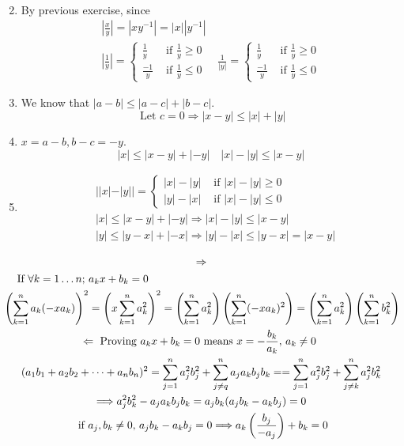 \documentclass[twoside]{amsart}
\theoremstyle{plain}
\theoremstyle{definition}
\newcommand{\exercisehead}[1]
  {\smallskip
   \noindent{\small\bf Exercise #1.}}
\begin{document}
\begin{enumerate}
\[\begin{aligned}
\end{aligned}
\]  
\item By previous exercise, since 
\[
\begin{gathered}
  \left| \frac{x}{y} \right| = |xy^{-1}| = |x||y^{-1}|  \\
  \left| \frac{1}{y} \right| = \begin{cases} \frac{1}{y} & \text{ if } \frac{1}{y} \geq 0 \\  \frac{-1}{y} & \text{ if } \frac{1}{y} \leq 0 \end{cases} \quad \frac{1}{ |y|} = \begin{cases}  \frac{1}{y} & \text{ if } \frac{1}{y} \geq 0 \\  \frac{-1}{y} & \text{ if } \frac{1}{y} \leq 0 \end{cases}   
\end{gathered}
\]
\item We know that $|a-b| \leq |a-c| + |b-c|$.  
\[
\text{ Let } c=0 \Longrightarrow |x-y| \leq |x| + |y| 
\]
\item $x = a-b, b-c = -y$.  
\[
|x| \leq |x-y| + |-y| \quad |x| - |y| \leq |x-y|
\]
\item \[
\begin{aligned}
  & ||x|-|y|| = \begin{cases} |x|-|y| & \text{ if } |x| - |y| \geq 0 \\  |y|-|x| & \text{ if } |x| - |y| \leq 0 \end{cases} \\ 
  & |x| \leq |x-y| + |-y| \Longrightarrow |x| - |y| \leq |x-y| \\
  & |y| \leq |y-x| + |-x| \Longrightarrow |y| - |x| \leq |y-x| = |x-y|  
\end{aligned}
\]
\end{enumerate}

\exercisehead{4}
\[
\begin{gathered}
  \Rightarrow \\
  \begin{aligned} & \quad \text{ If $\forall k = 1 \dots n ; \, a_k x + b_k = 0 $ }   \\
    & \left( \sum_{k=1}^n a_k (-x a_k) \right)^2 = \left( x \sum_{k=1}^n a_k^2 \right)^2 = \left( \sum_{k=1}^n a_k^2 \right)\left( \sum_{k=1}^n (-x a_k)^2 \right) = \left( \sum_{k=1}^n a_k^2 \right)\left( \sum_{k=1}^n b_k^2 \right) \\
    \end{aligned} \\
  \Leftarrow \text{ Proving $a_k x + b_k =0 $ means $ x = -\frac{b_k}{a_k}, \, a_k \neq 0 $ } \\
  (a_1 b_1 + a_2 b_2 + \dots + a_n b_n)^2 = \sum_{j=1}^n a_j^2 b_j^2 + \sum_{j \neq q}^n a_j a_k b_j b_k = = \sum_{j=1}^n a_j^2 b_j^2 + \sum_{j \neq k }^n a_j^2 b_k^2 \\
  \Longrightarrow a_j^2 b_k^2 - a_j a_k b_j b_k = a_j b_k (a_j b_k -a_k b_j) = 0 \\
  \text{ if } a_j, b_k \neq 0, \, a_j b_k -  a_k b_j = 0 \Longrightarrow a_k \left( \frac{b_j}{-a_j}\right)  + b_k  = 0   
\end{gathered}
\]
\end{document}
